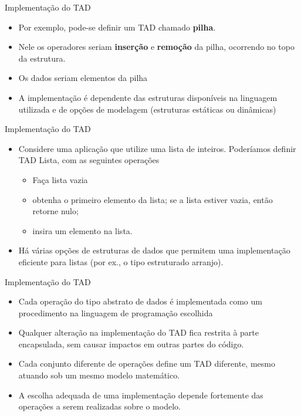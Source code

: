 \documentclass{beamer}
\begin{document}
\begin{frame}{Implementação do TAD}
    
\begin{itemize}
 \item Por exemplo, pode-se definir um TAD chamado \textbf{pilha}.
 \item Nele os operadores seriam \textbf{inserção} e \textbf{remoção} da pilha, ocorrendo no topo da estrutura.
 \item Os dados seriam elementos da pilha
 \item A implementação é dependente das estruturas disponíveis na linguagem utilizada e de opções de modelagem (estruturas estáticas ou dinâmicas)
\end{itemize}

\end{frame}


\begin{frame}{Implementação do TAD}
    
\begin{itemize}
 \item Considere uma aplicação que utilize uma lista
 de inteiros. Poderíamos definir TAD Lista,
com as seguintes operações 
\begin{itemize}
 \item Faça lista vazia
 \item obtenha o primeiro elemento da lista; se a lista
 estiver vazia, então retorne nulo;
 \item insira um elemento na lista.
\end{itemize}
\item Há várias opções de estruturas de dados que permitem uma implementação eficiente para
listas (por ex., o tipo estruturado arranjo).
\end{itemize}

\end{frame}


\begin{frame}{Implementação do TAD}
    
\begin{itemize}

\item Cada operação do tipo abstrato de dados é
 implementada como um procedimento na
linguagem de programação escolhida
\item Qualquer alteração na implementação do
 TAD fica restrita à parte encapsulada, sem
causar impactos em outras partes do código.
\item Cada conjunto diferente de operações define
 um TAD diferente, mesmo atuando sob um
mesmo modelo matemático.
\item A escolha adequada de uma implementação
 depende fortemente das operações a serem
realizadas sobre o modelo.
\end{itemize}

\end{frame}
\end{document}
